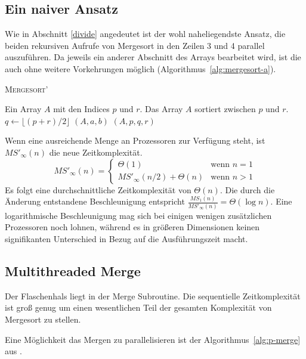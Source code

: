 \subsection{Ein naiver Ansatz}
Wie in Abschnitt \ref{divide} angedeutet ist der wohl naheliegendste Ansatz, die
beiden rekursiven Aufrufe von Mergesort in den Zeilen 3 und 4 parallel
auszuführen.
Da jeweils ein anderer Abschnitt des Arrays bearbeitet wird, ist die auch ohne
weitere Vorkehrungen möglich (Algorithmus~\ref{alg:mergesort-a}).
\begin{algorithm}
    \caption{{\rmfamily \textsc{Mergesort'}}}
    \label{alg:mergesort-a}
    \begin{algorithmic}[1]
        \Require Ein Array $A$ mit den Indices $p$ und $r$.
        \Ensure Das Array $A$ sortiert zwischen $p$ und $r$.
            \State $q \gets \lfloor (p + r) / 2 \rfloor$
                $(A, a, b)$
            \EndParDo
            $(A, p, q, r)$
        \EndIf
    \end{algorithmic}
\end{algorithm}
Wenn eine ausreichende Menge an Prozessoren zur Verfügung steht, ist
$MS'_\infty(n)$ die neue Zeitkomplexität.
\begin{equation}
    MS'_\infty(n) = \begin{cases}
        \Theta(1) & \text{wenn } n = 1 \\
        MS'_\infty(n/2) + \Theta(n) & \text{wenn } n > 1
    \end{cases}
\end{equation}
Es folgt eine durchschnittliche Zeitkomplexität von $\Theta(n)$.
Die durch die Änderung entstandene Beschleunigung entspricht
$\frac{MS_1(n)}{MS'_\infty(n)} = \Theta(\log n)$.
Eine logarithmische Beschleunigung mag sich bei einigen wenigen zusätzlichen
Prozessoren noch lohnen, während es in größeren Dimensionen keinen signifikanten
Unterschied in Bezug auf die Ausführungszeit macht.
\cite[S.797f.]{cormen}

\subsection{Multithreaded Merge}
Der Flaschenhals liegt in der Merge Subroutine.
Die sequentielle Zeitkomplexität ist groß genug um einen wesentlichen Teil der
gesamten Komplexität von Mergesort zu stellen.

Eine Möglichkeit das Mergen zu parallelisieren ist der
Algorithmus~\ref{alg:p-merge} aus \cite{cormen}.

